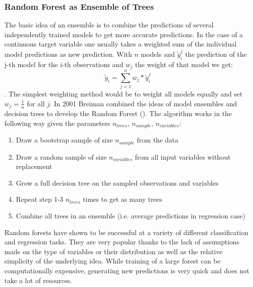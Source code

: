 \subsubsection{Random Forest as Ensemble of Trees}
The basic idea of an ensemble is to combine the predictions of several independently trained models to get more accurate predictions. In the case of a continuous target variable one usually takes a weighted sum of the individual model predictions as new prediction. With $n$ models and $\tilde{y}_i^j$ the prediction of the j-th model for the i-th observations and $w_j$ the weight of that model we get:
$$\tilde{y}_i = \sum_{j = 1}^n w_j * \tilde{y}_i^j$$. The simplest weighting method would be to weight all models equally and set $w_j = \frac{1}{n}$ for all $j$. In 2001 Breiman combined the ideas of model ensembles and decision trees to develop the Random Forest (\cite{breiman_random_2001}). The algorithm works in the following way given the parameters $n_{trees}$, $n_{sample}$, $n_{variables}$:
\begin{enumerate}
\item Draw a bootstrap sample of size $n_{sample}$ from the data
\item Draw a random sample of size $n_{variables}$ from all input variables without replacement
\item Grow a full decision tree on the sampled observations and variables
\item Repeat step 1-3 $n_{trees}$ times to get as many trees
\item Combine all trees in an ensemble (i.e. average predictions in regression case)
\end{enumerate}
Random forests have shown to be successful at a variety of different classification and regression tasks. They are very popular thanks to the lack of assumptions made on the type of variables or their distribution as well as the relative simplicity of the underlying idea. While training of a large forest can be computationally expensive, generating new predictions is very quick and does not take a lot of resources.
